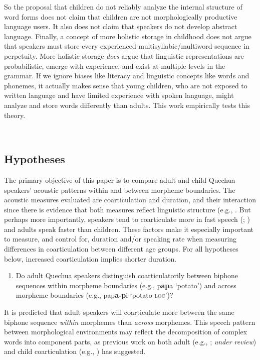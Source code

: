 \documentclass[a4paper,man,floatsintext,natbib,donotrepeattitle, apacite]{apa6}
\begin{document}
So the proposal that children do not reliably analyze the internal structure of word forms does not claim that children are not morphologically productive language users. It also does not claim that speakers do not develop abstract language. Finally, a concept of more holistic storage in childhood does not argue that speakers must store every experienced multisyllabic/multiword sequence in perpetuity. More holistic storage \textit{does} argue that linguistic representations are probabilistic, emerge with experience, and exist at multiple levels in the grammar. If we ignore biases like literacy and linguistic concepts like words and phonemes, it actually makes sense that young children, who are not exposed to written language and have limited experience with spoken language, might analyze and store words differently than adults. This work empirically tests this theory.

~
~

\subsection{Hypotheses}

The primary objective of this paper is to compare adult and child Quechua speakers' acoustic patterns within and between morpheme boundaries. The acoustic measures evaluated are coarticulation and duration, and their interaction since there is evidence that both measures reflect linguistic structure (e.g., \cite{songDurationalCuesFricative2013, songEffectsCoarticulationMorphological2013}. But perhaps more importantly, speakers tend to coarticulate more in fast speech (\citealt{gayMechanismsControlSpeech1981}; \citealt{matthiesVariationAnticipatoryCoarticulation2001}) and adults speak faster than children. These factors make it especially important to measure, and control for, duration and/or speaking rate when measuring differences in coarticulation between different age groups. For all hypotheses below, increased coarticulation implies shorter duration. 

\begin{enumerate}
    \item Do adult Quechua speakers distinguish coarticulatorily between biphone sequences within morpheme boundaries (e.g., p\textbf{ap}a `potato') and across morpheme boundaries (e.g., pap\textbf{a-p}i `potato-\textsc{loc}')? 
\end{enumerate}

It is predicted that adult speakers will coarticulate more between the same biphone sequence \textit{within} morphemes than \textit{across} morphemes. This speech pattern between morphological environments may reflect the decomposition of complex words into component parts, as previous work on both adult (e.g., \citealt{choEffectsMorphemeBoundaries2001}; \citeauthor{tomaschekHowAnticipatoryCoarticulation2019} \textit{under review}) and child coarticulation (e.g., \citealt{songEffectsCoarticulationMorphological2013}) has suggested.  
\end{document}

